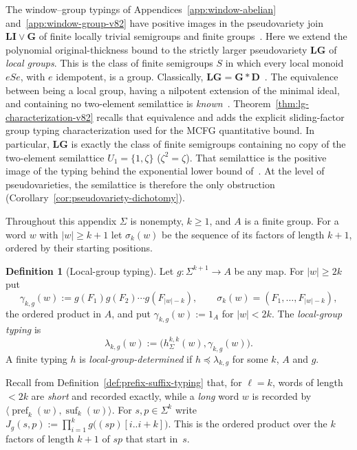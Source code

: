 \documentclass[11pt]{article}
\numberwithin{equation}{section}
\theoremstyle{plain}
\theoremstyle{definition}
\newtheorem{definition}[theorem]{Definition}
\theoremstyle{remark}
\theoremstyle{plain}
\begin{document}
The window--group typings of
Appendices~\ref{app:window-abelian} and~\ref{app:window-group-v82} have
positive images in the pseudovariety join $\mathbf{LI}\vee\mathbf{G}$ of
finite locally trivial semigroups and finite groups~\cite[Lemma~7.4]{kuriyamaCFG}.
Here we extend the polynomial original-thickness bound to the
strictly larger pseudovariety $\mathbf{LG}$ of \emph{local groups}.
This is the class of finite semigroups $S$ in which every local
monoid $eSe$, with $e$ idempotent, is a group.  Classically,
$\mathbf{LG}=\mathbf G*\mathbf D$~\cite{Straubing1985,Tilson1987}.
The equivalence between being a local group, having a nilpotent
extension of the minimal ideal, and containing no two-element
semilattice is \emph{known}~\cite[Proposition~2.3]{AlmeidaEtAl2009}.
Theorem~\ref{thm:lg-characterization-v82} recalls that equivalence and
adds the explicit sliding-factor group typing characterization used
for the MCFG quantitative bound.
In particular, $\mathbf{LG}$ is exactly the class of finite
semigroups containing no copy of the two-element semilattice
$U_1=\{1,\zeta\}$ ($\zeta^2=\zeta$).
That semilattice is the positive image of the typing behind the
exponential lower bound of~\cite{kuriyamaCFG}.  At the level of
pseudovarieties, the semilattice is therefore the only obstruction
(Corollary~\ref{cor:pseudovariety-dichotomy}).

Throughout this appendix $\Sigma$ is nonempty, $k\ge1$, and $A$ is a
finite group.  For a word $w$ with $|w|\ge k+1$ let
$\sigma_k(w)$ be the sequence of its factors of length $k+1$,
ordered by their starting positions.

\begin{definition}[Local-group typing]
\label{def:local-group-typing-v82}
Let $g:\Sigma^{k+1}\to A$ be any map.  For $|w|\ge2k$ put
\[
 \gamma_{k,g}(w):=g(F_1)g(F_2)\cdots g(F_{|w|-k}),
 \qquad \sigma_k(w)=(F_1,\ldots,F_{|w|-k}),
\]
the ordered product in $A$, and put $\gamma_{k,g}(w):=1_A$ for
$|w|<2k$.  The \emph{local-group typing} is
\[
 \lambda_{k,g}(w):=\bigl(h^{k,k}_\Sigma(w),\gamma_{k,g}(w)\bigr).
\]
A finite typing $h$ is \emph{local-group-determined} if
$h\preceq\lambda_{k,g}$ for some $k$, $A$ and $g$.
\end{definition}

Recall from Definition~\ref{def:prefix-suffix-typing} that, for $\ell=k$,
words of length $<2k$ are \emph{short} and recorded exactly, while a
\emph{long} word $w$ is recorded by
$\langle\operatorname{pref}_k(w),\operatorname{suf}_k(w)\rangle$.
For $s,p\in\Sigma^k$ write
$J_g(s,p):=\prod_{i=1}^{k}g\bigl((sp)[i..i+k]\bigr)$.
This is the ordered product over the $k$ factors of length $k+1$ of
$sp$ that start in~$s$.
\end{document}
